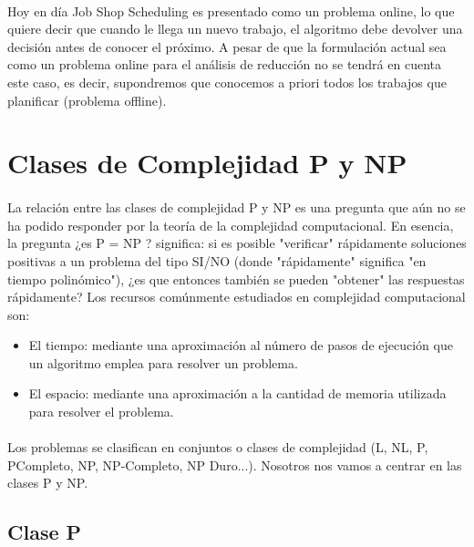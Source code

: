 \documentclass[11pt, a4paper,spanish]{article}
\begin{document}
			\paragraph{}
			Hoy en día Job Shop Scheduling es presentado como un problema online, lo que quiere decir que cuando le llega un nuevo trabajo, el algoritmo debe devolver una decisión antes de conocer el próximo. A pesar de que la formulación actual sea como un problema online para el análisis de reducción no se tendrá en cuenta este caso, es decir, supondremos que conocemos a priori todos los trabajos que planificar (problema offline).
	
		\section{Clases de Complejidad P y NP}
		
			\paragraph{}
			La relación entre las clases de complejidad P y NP es una pregunta que aún no se ha podido responder por la teoría de la complejidad computacional. En esencia, la pregunta ¿es P = NP ? significa: si es posible "verificar" rápidamente soluciones positivas a un problema del tipo SI/NO (donde "rápidamente" significa "en tiempo polinómico"), ¿es que entonces también se pueden "obtener" las respuestas rápidamente? Los recursos comúnmente estudiados en complejidad computacional son:

			\begin{itemize}
			
				\item El tiempo: mediante una aproximación al número de pasos de ejecución que un algoritmo emplea para resolver un problema.
			
				\item El espacio: mediante una aproximación a la cantidad de memoria utilizada para resolver el problema.

			\end{itemize}
			
			\paragraph{}
			Los problemas se clasifican en conjuntos o clases de complejidad (L, NL, P, PCompleto, NP, NP-Completo, NP Duro...). Nosotros nos vamos a centrar en las clases P y NP.

			\subsection{Clase P}
			
\end{document}
